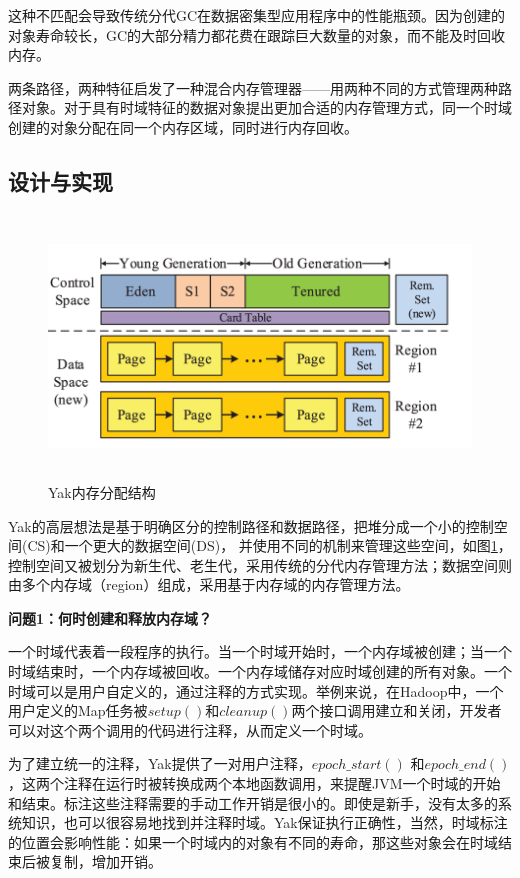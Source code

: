 这种不匹配会导致传统分代GC在数据密集型应用程序中的性能瓶颈。因为创建的对象寿命较长，GC的大部分精力都花费在跟踪巨大数量的对象，而不能及时回收内存。 

两条路径，两种特征启发了一种混合内存管理器——用两种不同的方式管理两种路径对象。对于具有时域特征的数据对象提出更加合适的内存管理方式，同一个时域创建的对象分配在同一个内存区域，同时进行内存回收。

\subsection{设计与实现}
\begin{figure}[h]
    \centering
    \includegraphics[width=12cm,height=7cm]{figure/layout.png}
    \caption{
       Yak内存分配结构
    }
    \label{img3}
\end{figure}

Yak的高层想法是基于明确区分的控制路径和数据路径，把堆分成一个小的控制空间(CS)和一个更大的数据空间(DS)， 并使用不同的机制来管理这些空间，如图\ref{img3}，控制空间又被划分为新生代、老生代，采用传统的分代内存管理方法；数据空间则由多个内存域（region）组成，采用基于内存域的内存管理方法。

{\bfseries 问题1：何时创建和释放内存域？}

一个时域代表着一段程序的执行。当一个时域开始时，一个内存域被创建；当一个时域结束时，一个内存域被回收。一个内存域储存对应时域创建的所有对象。一个时域可以是用户自定义的，通过注释的方式实现。举例来说，在Hadoop中，一个用户定义的Map任务被$setup()$和$cleanup()$两个接口调用建立和关闭，开发者可以对这个两个调用的代码进行注释，从而定义一个时域。

为了建立统一的注释，Yak提供了一对用户注释，$epoch\_start()$ 和$epoch\_end()$，这两个注释在运行时被转换成两个本地函数调用，来提醒JVM一个时域的开始和结束。标注这些注释需要的手动工作开销是很小的。即使是新手，没有太多的系统知识，也可以很容易地找到并注释时域。Yak保证执行正确性，当然，时域标注的位置会影响性能：如果一个时域内的对象有不同的寿命，那这些对象会在时域结束后被复制，增加开销。

